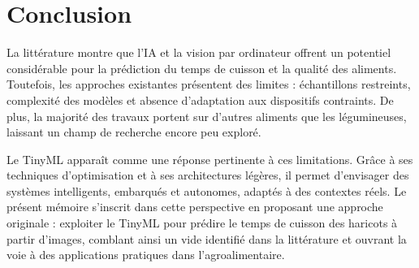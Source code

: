 \section{Conclusion}
La littérature montre que l’IA et la vision par ordinateur offrent un potentiel considérable pour la prédiction du temps de cuisson et la qualité des aliments. Toutefois, les approches existantes présentent des limites : échantillons restreints, complexité des modèles et absence d’adaptation aux dispositifs contraints. De plus, la majorité des travaux portent sur d’autres aliments que les légumineuses, laissant un champ de recherche encore peu exploré.

Le TinyML apparaît comme une réponse pertinente à ces limitations. Grâce à ses techniques d’optimisation et à ses architectures légères, il permet d’envisager des systèmes intelligents, embarqués et autonomes, adaptés à des contextes réels. Le présent mémoire s’inscrit dans cette perspective en proposant une approche originale : exploiter le TinyML pour prédire le temps de cuisson des haricots à partir d’images, comblant ainsi un vide identifié dans la littérature et ouvrant la voie à des applications pratiques dans l’agroalimentaire.
